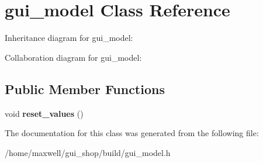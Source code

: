 \hypertarget{classgui__model}{}\section{gui\+\_\+model Class Reference}
\label{classgui__model}


Inheritance diagram for gui\+\_\+model\+:


Collaboration diagram for gui\+\_\+model\+:
\subsection*{Public Member Functions}
\begin{DoxyCompactItemize}
\item 
void {\bfseries reset\+\_\+values} ()\hypertarget{classgui__model_a01304567de0a35af690375f76866c374}{}\label{classgui__model_a01304567de0a35af690375f76866c374}

\end{DoxyCompactItemize}


The documentation for this class was generated from the following file\+:\begin{DoxyCompactItemize}
\item 
/home/maxwell/gui\+\_\+shop/build/gui\+\_\+model.\+h\end{DoxyCompactItemize}
